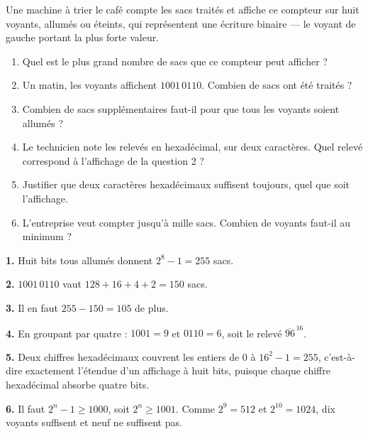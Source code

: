 \begin{jecherche}
Une machine à trier le café compte les sacs traités et affiche ce compteur sur
huit voyants, allumés ou éteints, qui représentent une écriture binaire — le
voyant de gauche portant la plus forte valeur.

\begin{enumerate}[label=\textbf{\arabic*.}, leftmargin=*, itemsep=0.3em]
  \item Quel est le plus grand nombre de sacs que ce compteur peut afficher ?
  \item Un matin, les voyants affichent $1001\,0110$. Combien de sacs ont été
        traités ?
  \item Combien de sacs supplémentaires faut-il pour que tous les voyants
        soient allumés ?
  \item Le technicien note les relevés en hexadécimal, sur deux caractères.
        Quel relevé correspond à l'affichage de la question 2 ?
  \item Justifier que deux caractères hexadécimaux suffisent toujours, quel
        que soit l'affichage.
  \item L'entreprise veut compter jusqu'à mille sacs. Combien de voyants
        faut-il au minimum ?
\end{enumerate}
\end{jecherche}

\begin{corrige}
\textbf{1.} Huit bits tous allumés donnent
$2^{8}-1 = 255$ sacs.

\textbf{2.} $1001\,0110$ vaut $128+16+4+2 = 150$ sacs.

\textbf{3.} Il en faut $255-150 = 105$ de plus.

\textbf{4.} En groupant par quatre : $1001 = 9$ et $0110 = 6$, soit le relevé
$\overline{96}^{\,16}$.

\textbf{5.} Deux chiffres hexadécimaux couvrent les entiers de $0$ à
$16^{2}-1 = 255$, c'est-à-dire exactement l'étendue d'un affichage à huit
bits, puisque chaque chiffre hexadécimal absorbe quatre bits.

\textbf{6.} Il faut $2^{n}-1 \geq 1000$, soit $2^{n} \geq 1001$. Comme
$2^{9} = 512$ et $2^{10} = 1024$, dix voyants suffisent et neuf ne suffisent
pas.
\end{corrige}

